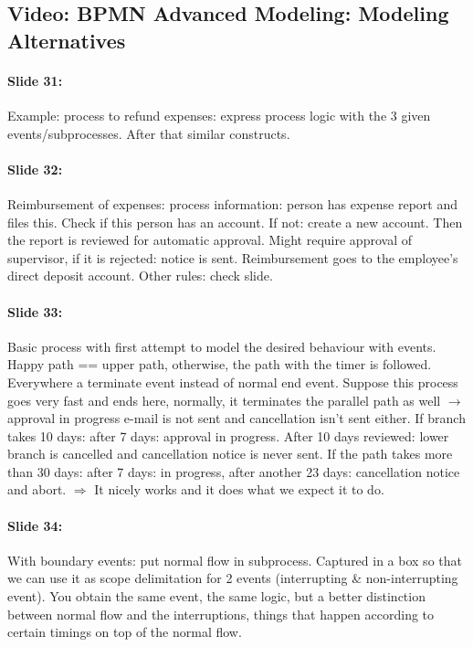 \documentclass[10pt,a4paper]{report}
\begin{document}
\subsection{Video: BPMN Advanced Modeling: Modeling Alternatives}

\paragraph{Slide 31:}Example: process to refund expenses: express process logic with the 3 given events/subprocesses. After that similar constructs.

\paragraph{Slide 32:}Reimbursement of expenses: process information: person has expense report and files this. Check if this person has an account. If not: create a new account. Then the report is reviewed for automatic approval. Might require approval of supervisor, if it is rejected: notice is sent. Reimbursement goes to the employee's direct deposit account. Other rules: check slide. 

\paragraph{Slide 33:}Basic process with first attempt to model the desired behaviour with events. Happy path == upper path, otherwise, the path with the timer is followed. Everywhere a terminate event instead of normal end event. Suppose this process goes very fast and ends here, normally, it terminates the parallel path as well $\rightarrow$ approval in progress e-mail is not sent and cancellation isn't sent either. If branch takes 10 days: after 7 days: approval in progress. After 10 days reviewed: lower branch is cancelled and cancellation notice is never sent. If the path takes more than 30 days: after 7 days: in progress, after another 23 days: cancellation notice and abort. $\Rightarrow$ It nicely works and it does what we expect it to do.

\paragraph{Slide 34:}With boundary events: put normal flow in subprocess. Captured in a box so that we can use it as scope delimitation for 2 events (interrupting \& non-interrupting event). You obtain the same event, the same logic, but a better distinction between normal flow and the interruptions, things that happen according to certain timings on top of the normal flow.
\end{document}
